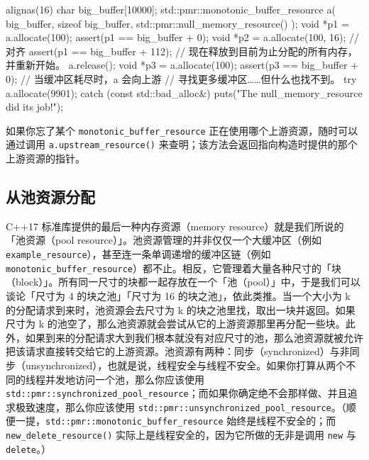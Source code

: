 \begin{codebox}[cpp]
     alignas(16) char big_buffer[10000];
     std::pmr::monotonic_buffer_resource a(
       big_buffer, sizeof big_buffer,
       std::pmr::null_memory_resource()
     );
     void *p1 = a.allocate(100);
     assert(p1 == big_buffer + 0);
     void *p2 = a.allocate(100, 16); // 对齐
     assert(p1 == big_buffer + 112);
     // 现在释放到目前为止分配的所有内存，并重新开始。
     a.release();
     void *p3 = a.allocate(100);
     assert(p3 == big_buffer + 0);
     // 当缓冲区耗尽时，a 会向上游
     // 寻找更多缓冲区……但什么也找不到。
     try {
       a.allocate(9901);
     } catch (const std::bad_alloc&) {
       puts("The null_memory_resource did its job!");
     }
\end{codebox}

如果你忘了某个 \texttt{monotonic\_\allowbreak{}buffer\_\allowbreak{}resource} 正在使用哪个上游资源，随时可以通过调用 \texttt{a.\allowbreak{}upstream\_\allowbreak{}resource(\allowbreak{})\allowbreak{}} 来查明；该方法会返回指向构造时提供的那个上游资源的指针。

\subsection{从池资源分配}

C++17 标准库提供的最后一种内存资源（memory resource）就是我们所说的「池资源（pool resource）」。池资源管理的并非仅仅一个大缓冲区（例如 \texttt{example\_\allowbreak{}resource}），甚至连一条单调递增的缓冲区链（例如 \texttt{monotonic\_\allowbreak{}buffer\_\allowbreak{}resource}）都不止。相反，它管理着大量各种尺寸的「块（block）」。所有同一尺寸的块都一起存放在一个「池（pool）」中，于是我们可以谈论「尺寸为 4 的块之池」「尺寸为 16 的块之池」，依此类推。当一个大小为 k 的分配请求到来时，池资源会去尺寸为 k 的块之池里找，取出一块并返回。如果尺寸为 k 的池空了，那么池资源就会尝试从它的上游资源那里再分配一些块。此外，如果到来的分配请求大到我们根本就没有对应尺寸的池，那么池资源就被允许把该请求直接转交给它的上游资源。池资源有两种：同步（synchronized）与非同步（unsynchronized），也就是说，线程安全与线程不安全。如果你打算从两个不同的线程并发地访问一个池，那么你应该使用 \texttt{std::\allowbreak{}pmr::\allowbreak{}synchronized\_\allowbreak{}pool\_\allowbreak{}resource}；而如果你确定绝不会那样做、并且追求极致速度，那么你应该使用 \texttt{std::\allowbreak{}pmr::\allowbreak{}unsynchronized\_\allowbreak{}pool\_\allowbreak{}resource}。（顺便一提，\texttt{std::\allowbreak{}pmr::\allowbreak{}monotonic\_\allowbreak{}buffer\_\allowbreak{}resource} 始终是线程不安全的；而 \texttt{new\_\allowbreak{}delete\_\allowbreak{}resource(\allowbreak{})\allowbreak{}} 实际上是线程安全的，因为它所做的无非是调用 \texttt{new} 与 \texttt{delete}。）

